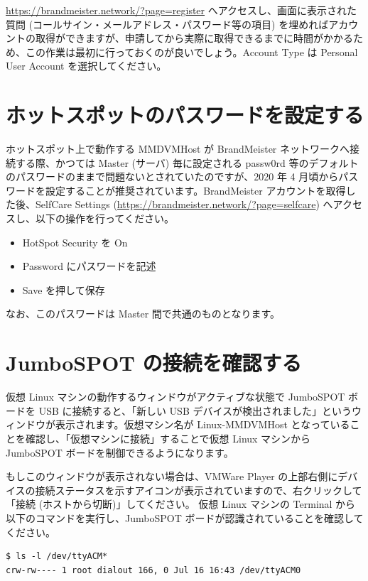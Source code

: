 \documentclass[a4j,oneside]{ujbook}
\begin{document}
\url{https://brandmeister.network/?page=register} へアクセスし、画面に表示された質問 (コールサイン・メールアドレス・パスワード等の項目) を埋めればアカウントの取得ができますが、申請してから実際に取得できるまでに時間がかかるため、この作業は最初に行っておくのが良いでしょう。Account Type は Personal User Account を選択してください。

\section{ホットスポットのパスワードを設定する}

ホットスポット上で動作する MMDVMHost が BrandMeister ネットワークへ接続する際、かつては Master (サーバ) 毎に設定される passw0rd 等のデフォルトのパスワードのままで問題ないとされていたのですが、2020 年 4 月頃からパスワードを設定することが推奨されています。BrandMeister アカウントを取得した後、SelfCare Settings (\url{https://brandmeister.network/?page=selfcare}) へアクセスし、以下の操作を行ってください。
\begin{itemize}
 \item HotSpot Security を On
 \item Password にパスワードを記述
 \item Save を押して保存
\end{itemize}
なお、このパスワードは Master 間で共通のものとなります。

\section{JumboSPOT の接続を確認する}

仮想 Linux マシンの動作するウィンドウがアクティブな状態で JumboSPOT ボードを USB に接続すると、「新しい USB デバイスが検出されました」というウィンドウが表示されます。仮想マシン名が Linux-MMDVMHost となっていることを確認し、「仮想マシンに接続」することで仮想 Linux マシンから JumboSPOT ボードを制御できるようになります。

もしこのウィンドウが表示されない場合は、VMWare Player の上部右側にデバイスの接続ステータスを示すアイコンが表示されていますので、右クリックして「接続 (ホストから切断)」してください。
仮想 Linux マシンの Terminal から以下のコマンドを実行し、JumboSPOT ボードが認識されていることを確認してください。

\begin{verbatim}
$ ls -l /dev/ttyACM*
crw-rw---- 1 root dialout 166, 0 Jul 16 16:43 /dev/ttyACM0
\end{verbatim}
\end{document}
